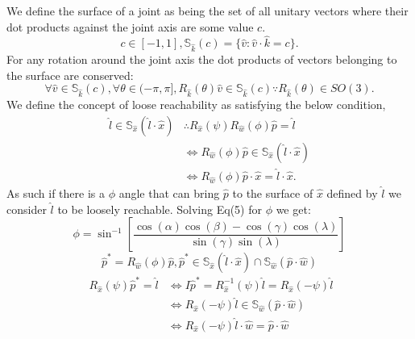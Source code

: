 \documentclass[a4paper,onecolumn,11pt]{article}
\begin{document}
We define the surface of a joint as being the set of all unitary vectors where
their dot products against the joint axis are some value $c$.
\begin{equation} 
    c \in [-1,1], \mathbb{S}_{\hat k}(c) = \{ \hat v :
        \hat v \cdot \hat k = c \}.
\end{equation}
For any rotation around the joint axis the dot products of vectors belonging
to the surface are conserved:
\begin{equation}
    \forall \hat v \in \mathbb{S}_{\hat k}(c), \forall \theta \in (-\pi,\pi],
        R_{\hat k}(\theta)\hat v \in \mathbb{S}_{\hat k}(c)
        \because R_{\hat k}(\theta) \in SO(3).
\end{equation}
We define the concept of loose reachability as satisfying the below condition,
\begin{align}
        \hat l \in \mathbb{S}_{\hat x} (\hat l \cdot \hat x) & \therefore 
        R_{\hat x} (\psi) R_{\hat w}(\phi) \hat p = \hat l \\
        & \Leftrightarrow R_{\hat w}(\phi) \hat p 
        \in \mathbb{S}_{\hat x}(\hat l \cdot \hat x) \\
        & \Leftrightarrow R_{\hat w} (\phi) \hat p \cdot \hat x = 
        \hat l \cdot \hat x.
\end{align}
As such if there is a $\phi$ angle that can bring $\hat p$ to the surface
of $\hat x$ defined by $\hat l$ we consider $\hat l$ to be loosely reachable.
Solving Eq(5) for $\phi$ we get:
\begin{equation}
    \phi = \sin^{-1} \left[
        \frac{ \cos(\alpha) \cos(\beta) - \cos(\gamma) \cos(\lambda) }
        { \sin(\gamma) \sin(\lambda) }
    \right]
\end{equation}
\newpage
\begin{equation}
    \hat p^* = R_{\hat w}(\phi) \hat p, 
    \hat p^* \in \mathbb{S}_{\hat x}(\hat l \cdot \hat x) 
    \cap \mathbb{S}_{\hat w}(\hat p \cdot \hat w)
\end{equation}
\begin{equation}
    \begin{split}
        \;R_{\hat x}(\psi)\hat p^* = \hat l 
        & \iff I \hat p^* = R_{\hat x}^{-1}(\psi) \hat l 
        = R_{\hat x}(-\psi) \hat l \\ 
        & \iff R_{\hat x}(-\psi) \hat l 
        \in \mathbb{S}_{\hat w}(\hat p \cdot \hat w) \\
        & \iff R_{\hat x}(-\psi) \hat l \cdot \hat w = \hat p \cdot \hat w
    \end{split}
\end{equation}
\end{document}

